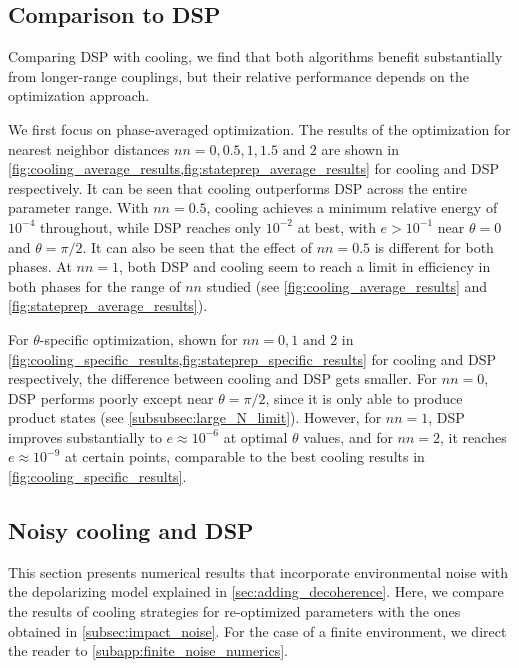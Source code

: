 \documentclass[aps,prx,twocolumn,superscriptaddress,nofootinbib,nolongbibliography,nobalancelastpage,10pt,floatfix]{revtex4-2}
\begin{document}
\subsection{Comparison to DSP}

Comparing DSP with cooling, we find that both algorithms benefit substantially from longer-range couplings, but their relative performance depends on the optimization approach.

We first focus on phase-averaged optimization. The results of the optimization for nearest neighbor distances $nn=0,0.5,1,1.5 \text{ and }2$ are shown in \cref{fig:cooling_average_results,fig:stateprep_average_results} for cooling and DSP respectively. It can be seen that cooling outperforms DSP across the entire parameter range. With $nn=0.5$, cooling achieves a minimum relative energy of $10^{-4}$ throughout, while DSP reaches only $10^{-2}$ at best, with $e>10^{-1}$ near $\theta=0$ and $\theta=\pi/2$. It can also be seen that the effect of $nn=0.5$ is different for both phases. At $nn=1$, both DSP and cooling seem to reach a limit in efficiency in both phases for the range of $nn$ studied (see \cref{fig:cooling_average_results} and \cref{fig:stateprep_average_results}).

For $\theta$-specific optimization, shown for $nn=0,1\text{ and }2$ in \cref{fig:cooling_specific_results,fig:stateprep_specific_results} for cooling and DSP respectively, the difference between cooling and DSP gets smaller. For $nn=0$, DSP performs poorly except near $\theta=\pi/2$, since it is only able to produce product states (see \cref{subsubsec:large_N_limit}). However, for $nn=1$, DSP improves substantially to $e\approx10^{-6}$ at optimal $\theta$ values, and for $nn=2$, it reaches $e\approx10^{-9}$ at certain points, comparable to the best cooling results in \cref{fig:cooling_specific_results}.

\subsection{Noisy cooling and DSP}
\label{sec:noisy-regime}

This section presents numerical results that incorporate environmental noise with the depolarizing model explained in \cref{sec:adding_decoherence}. Here, we compare the results of cooling strategies for re-optimized parameters with the ones obtained in \cref{subsec:impact_noise}. For the case of a finite environment, we direct the reader to \cref{subapp:finite_noise_numerics}.
\end{document}
